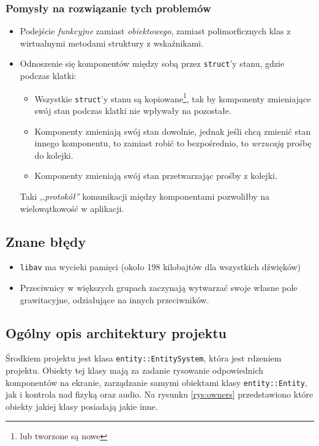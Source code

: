 \documentclass[a4paper,11pt]{article}
\begin{document}
\subsubsection*{Pomysły na rozwiązanie tych problemów}

\begin{itemize}
    \item Podejście \emph{funkcyjne} zamiast \emph{obiektowego}, zamiast polimorficznych klas z wirtualnymi metodami struktury z wskaźnikami.
    \item Odnoszenie się komponentów między sobą przez \texttt{struct}'y stanu, gdzie podczas klatki: 
        \begin{itemize}
            \item Wszystkie \texttt{struct}'y stanu są kopiowane\footnote{lub tworzone są nowe}, tak by komponenty zmieniające swój stan podczas klatki nie wpływały na pozostałe.
            \item Komponenty zmieniają swój stan dowolnie, jednak jeśli chcą zmienić stan innego komponentu, to zamiast robić to bezpośrednio, to \emph{wrzucają} prośbę do kolejki.
            \item Komponenty zmieniają swój stan przetwarzając prośby z kolejki.
        \end{itemize}
        Taki \emph{,,protokół''} komunikacji między komponentami pozwoliłby na wielowątkowość w aplikacji.
\end{itemize}

\subsection{Znane błędy}

\begin{itemize}
    \item \texttt{libav} ma wycieki pamięci (około 198 kilobajtów dla wszystkich
        dźwięków)
    \item Przeciwnicy w większych grupach zaczynają wytwarzać swoje własne pole
        grawitacyjne, odziałujące na innych przeciwników.
\end{itemize}

\subsection{Ogólny opis architektury projektu}

Środkiem projektu jest klasa \texttt{entity::EntitySystem}, która jest rdzeniem projektu. Obiekty tej klasy mają za zadanie rysowanie odpowiednich komponentów na ekranie, zarządzanie samymi obiektami klasy \texttt{entity::Entity}, jak i kontrola nad fizyką oraz audio. Na rysunku \ref{rys:owners} przedstawiono które obiekty jakiej klasy posiadają jakie inne.
\end{document}

